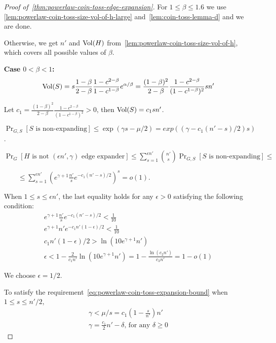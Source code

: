 \begin{proof}[Proof of~\autoref{thm:powerlaw-coin-toss-edge-expansion}]
    \label{prf:powerlaw-coin-toss-edge-expansion}
    For $1\leq\beta\leq 1.6$ we use
    \autoref{lem:powerlaw-coin-toss-size-vol-of-h-large}
    and~\autoref{lem:coin-toss-lemma-d} and we are done.
    
    Otherwise, we get $n'$ and $\operatorname*{Vol}(H)$ from~\autoref{lem:powerlaw-coin-toss-size-vol-of-h},
    which covers all possible values of $\beta$.
    
    \textbf{Case $0<\beta<1$:}
    \begin{equation*}
        \operatorname*{Vol}(S)=s\frac{1-\beta}{2-\beta}\frac{1-c^{2-\beta}}{1-c^{1-\beta}}e^{\alpha/\beta}
        =\frac{(1-\beta)^2}{2-\beta}\frac{1-c^{2-\beta}}{(1-c^{1-\beta})^2}sn'
    \end{equation*}
    
    Let $c_1=\frac{(1-\beta)^2}{2-\beta}\frac{1-c^{2-\beta}}{(1-c^{1-\beta})^2}>0$,
    then $\operatorname*{Vol}(S)=c_1sn'$.
    
    $\Pr_{G,S}[S\text{ is non-expanding}]\leq\exp(\gamma s-\mu/2)
    =exp\left(\left(\gamma-c_1(n'-s)/2\right)s\right)$.
    
    $\Pr_G[H\text{ is not }(\epsilon n',\gamma)\text{ edge expander}]
    \leq\sum_{s=1}^{\epsilon n'}{\binom{n'}{s}\Pr_{G,S}[S\text{ is non-expanding}]}\leq$
    
    $\qquad\leq\sum_{s=1}^{\epsilon n'}{\left(e^{\gamma+1}\frac{n'}{s}e^{-c_1(n'-s)/2}\right)^s}=o(1)$.
    
    When $1\leq s\leq\epsilon n'$, the last equality holds for any $\epsilon>0$ satisfying the following condition:
    \begin{gather*}
        e^{\gamma+1}\frac{n'}{s}e^{-c_1(n'-s)/2}<\frac{1}{10}\\
        e^{\gamma+1}n'e^{-c_1n'(1-\epsilon)/2}<\frac{1}{10}\\
        c_1n'(1-\epsilon)/2>\ln\left(10e^{\gamma+1}n'\right)\\
        \epsilon<1-\frac{2}{c_1n'}\ln\left(10e^{\gamma+1}n'\right)
        =1-\frac{\ln(c_2n')}{c_3n'}=1-o(1)
    \end{gather*}
    
    We choose $\epsilon=1/2$.
    
    To satisfy the requirement~\eqref{eq:powerlaw-coin-toss-expansion-bound} when $1\leq s\leq n'/2$,
    \begin{gather*}
        \gamma<\mu/s=c_1(1-\frac{s}{n'})n'\\
        \gamma=\frac{c_1}{2}n'-\delta\text{, for any }\delta\geq 0
    \end{gather*}
    

\end{proof}

